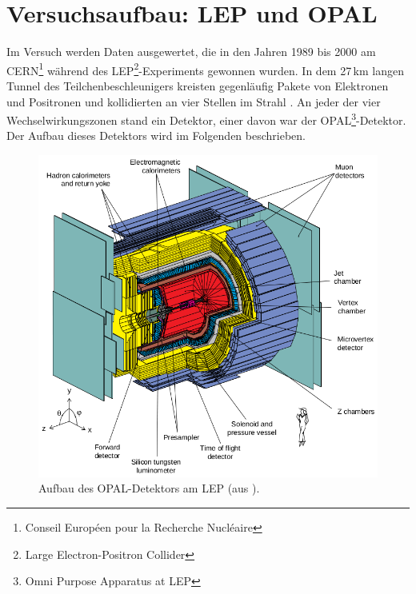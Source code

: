 \section{Versuchsaufbau: LEP und OPAL}
Im Versuch werden Daten ausgewertet, die in den Jahren 1989 bis 2000 am
CERN\footnote{Conseil Européen pour la Recherche Nucléaire} während des
LEP\footnote{Large Electron-Positron Collider}-Experiments gewonnen wurden.
In dem 27\,km langen Tunnel des Teilchenbeschleunigers kreisten gegenläufig Pakete von Elektronen und Positronen
und kollidierten an vier Stellen im Strahl \cite{manual}.
An jeder der vier Wechselwirkungszonen stand ein Detektor, einer davon war der
OPAL\footnote{Omni Purpose Apparatus at LEP}-Detektor.
Der Aufbau dieses Detektors wird im Folgenden beschrieben.

\begin{figure}[H]
\begin{center}
  \includegraphics[width=\textwidth]{../img/aufbau.png}
  \caption{Aufbau des OPAL-Detektors am LEP (aus \cite{manualmuc}).}
  \label{img:aufbau}
\end{center}
\end{figure} 

